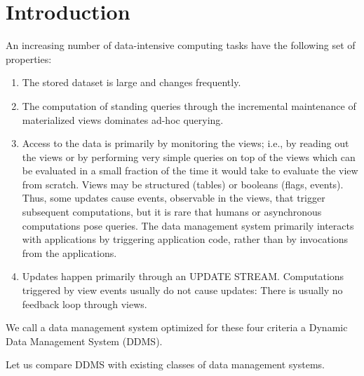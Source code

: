 

\section{Introduction}


An increasing number of data-intensive computing tasks have the following set of properties:


\begin{enumerate}
\item The stored dataset is large and changes frequently.

\item The computation of standing queries through the incremental maintenance of materialized views dominates ad-hoc querying.

\item Access to the data is primarily by monitoring the views; i.e., by reading out the views or by performing very simple queries on top of the views which can be evaluated in a small fraction of the time it would take to evaluate the view from scratch. Views may be structured (tables) or booleans (flags, events). Thus, some updates cause events, observable in the views, that trigger subsequent computations, but it is rare that humans or asynchronous computations pose queries. The data management system primarily interacts with applications by triggering application code, rather than by invocations from the applications.

\item Updates happen primarily through an UPDATE STREAM. Computations triggered by view events usually do not cause updates: There is usually no feedback loop through views.
\end{enumerate}

We call a data management system optimized for these four criteria a Dynamic Data Management System (DDMS).



Let us compare DDMS with existing classes of data management systems.

